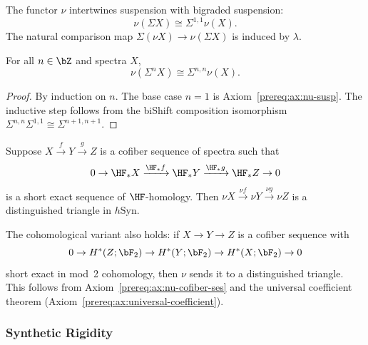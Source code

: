 \begin{axiom}\label{prereq:ax:nu-susp}
    \leanok
    The functor $\nu$ intertwines suspension with bigraded suspension:
    $$\nu(\Sigma X) \cong \Sigma^{1,1} \nu(X).$$
    The natural comparison map $\Sigma(\nu X) \to \nu(\Sigma X)$ is induced by $\lambda$.
\end{axiom}

\begin{theorem}\label{prereq:thm:nu-shift-bishift}
    \leanok
    For all $n \in \bZ$ and spectra $X$,
    $$\nu(\Sigma^n X) \cong \Sigma^{n,n}\nu(X).$$
\end{theorem}
\begin{proof}
    By induction on $n$. The base case $n = 1$ is Axiom~\ref{prereq:ax:nu-susp}. The inductive step follows from the biShift composition isomorphism $\Sigma^{n,n}\Sigma^{1,1} \cong \Sigma^{n+1,n+1}$.
\end{proof}

\begin{axiom}\label{prereq:ax:nu-cofiber-ses}
    \leanok
    Suppose $X \xrightarrow{f} Y \xrightarrow{g} Z$ is a cofiber sequence of spectra such that
    $$0 \to {\HF}_*X \xrightarrow{{\HF}_*f} {\HF}_*Y \xrightarrow{{\HF}_*g} {\HF}_*Z \to 0$$
    is a short exact sequence of $\HF$-homology. Then $\nu X \xrightarrow{\nu f} \nu Y \xrightarrow{\nu g} \nu Z$ is a distinguished triangle in $h\mathrm{Syn}$.
\end{axiom}

\begin{remark}\label{prereq:rem:nu-cofiber-cohomological}
    \leanok
    The cohomological variant also holds: if $X \to Y \to Z$ is a cofiber sequence with
    $$0 \to H^*(Z; \bF_2) \to H^*(Y; \bF_2) \to H^*(X; \bF_2) \to 0$$
    short exact in mod~2 cohomology, then $\nu$ sends it to a distinguished triangle. This follows from Axiom~\ref{prereq:ax:nu-cofiber-ses} and the universal coefficient theorem (Axiom~\ref{prereq:ax:universal-coefficient}).
\end{remark}

\subsubsection{Synthetic Rigidity}\label{sec:prereq-syn-rigidity}


